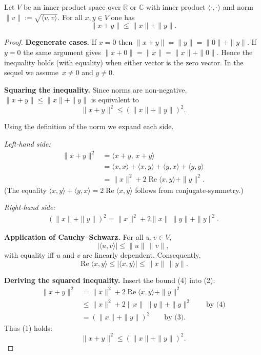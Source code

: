 \begin{theorem}
Let \(V\) be an inner‑product space over \(\mathbb{R}\) or \(\mathbb{C}\) with inner product \(\langle\cdot,\cdot\rangle\) and norm \(\|v\|:=\sqrt{\langle v,v\rangle}\).
For all \(x,y\in V\) one has  
\[
\|x+y\|\le \|x\|+\|y\|.
\]
\end{theorem}

\begin{proof}
\textbf{Degenerate cases.}  
If \(x=0\) then \(\|x+y\|=\|y\|=\|0\|+\|y\|\).  
If \(y=0\) the same argument gives \(\|x+0\|=\|x\|=\|x\|+\|0\|\).  
Hence the inequality holds (with equality) when either vector is the zero vector.
In the sequel we assume \(\,x\neq0\) and \(y\neq0\).

\medskip
\textbf{Squaring the inequality.}  
Since norms are non‑negative, \(\|x+y\|\le\|x\|+\|y\|\) is equivalent to  
\[
\|x+y\|^{2}\le(\|x\|+\|y\|)^{2}. \tag{1}
\]

Using the definition of the norm we expand each side.

\noindent\textit{Left‑hand side:}
\begin{align*}
\|x+y\|^{2}
   &=\langle x+y,\,x+y\rangle\\
   &=\langle x,x\rangle+\langle x,y\rangle+\langle y,x\rangle+\langle y,y\rangle\\
   &=\|x\|^{2}+2\operatorname{Re}\langle x,y\rangle+\|y\|^{2}. \tag{2}
\end{align*}
(The equality \(\langle x,y\rangle+\langle y,x\rangle
   =2\operatorname{Re}\langle x,y\rangle\) follows from conjugate‑symmetry.)

\noindent\textit{Right‑hand side:}
\begin{align}
(\|x\|+\|y\|)^{2}= \|x\|^{2}+2\|x\|\,\|y\|+\|y\|^{2}. \tag{3}
\end{align}

\medskip
\textbf{Application of Cauchy–Schwarz.}  
For all \(u,v\in V\),
\[
|\langle u,v\rangle|\le\|u\|\,\|v\|,
\]
with equality iff \(u\) and \(v\) are linearly dependent.
Consequently,
\[
\operatorname{Re}\langle x,y\rangle\le |\langle x,y\rangle|
                                 \le \|x\|\,\|y\|. \tag{4}
\]

\medskip
\textbf{Deriving the squared inequality.}  
Insert the bound (4) into (2):
\begin{align*}
\|x+y\|^{2}
   &=\|x\|^{2}+2\operatorname{Re}\langle x,y\rangle+\|y\|^{2}\\
   &\le\|x\|^{2}+2\|x\|\,\|y\|+\|y\|^{2}\qquad\text{by (4)}\\
   &= (\|x\|+\|y\|)^{2} \qquad\text{by (3)}.
\end{align*}
Thus (1) holds:
\[
\|x+y\|^{2}\le(\|x\|+\|y\|)^{2}.
\]


\end{proof}
